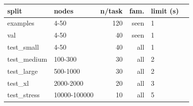 \begin{tabular}{llrrlr}
\toprule
split & nodes & n/task & fam. & limit (s) \\
\midrule
examples & 4-50 & 120 & seen & 1 \\
val & 4-50 & 40 & seen & 1 \\
test\_small & 4-50 & 40 & all & 1 \\
test\_medium & 100-300 & 30 & all & 2 \\
test\_large & 500-1000 & 30 & all & 2 \\
test\_xl & 2000-2000 & 20 & all & 3 \\
test\_stress & 10000-100000 & 10 & all & 5 \\
\bottomrule
\end{tabular}
